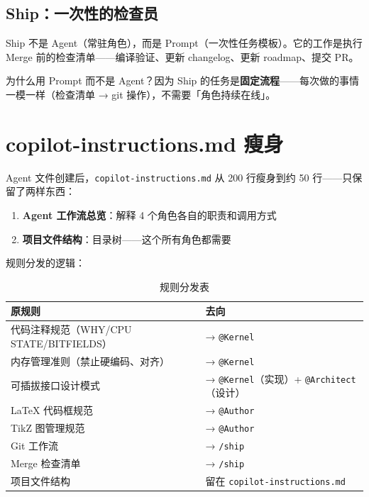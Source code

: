 \subsection{Ship：一次性的检查员}


Ship 不是 Agent（常驻角色），而是 Prompt（一次性任务模板）。它的工作是执行 Merge 前的检查清单——编译验证、更新 changelog、更新 roadmap、提交 PR。

为什么用 Prompt 而不是 Agent？因为 Ship 的任务是\textbf{固定流程}——每次做的事情一模一样（检查清单 → git 操作），不需要「角色持续在线」。

\section{copilot-instructions.md 瘦身}

Agent 文件创建后，\texttt{copilot-instructions.md} 从 200 行瘦身到约 50 行——只保留了两样东西：

\begin{enumerate}
  \item \textbf{Agent 工作流总览}：解释 4 个角色各自的职责和调用方式
  \item \textbf{项目文件结构}：目录树——这个所有角色都需要
\end{enumerate}

规则分发的逻辑：

\begin{table}[H]
\centering
\small
\begin{tabularx}{\textwidth}{lX}
\toprule
\textbf{原规则} & \textbf{去向} \\
\midrule
代码注释规范（WHY/CPU STATE/BITFIELDS） & → \texttt{@Kernel} \\
内存管理准则（禁止硬编码、对齐） & → \texttt{@Kernel} \\
可插拔接口设计模式 & → \texttt{@Kernel}（实现）+ \texttt{@Architect}（设计） \\
LaTeX 代码框规范 & → \texttt{@Author} \\
TikZ 图管理规范 & → \texttt{@Author} \\
Git 工作流 & → \texttt{/ship} \\
Merge 检查清单 & → \texttt{/ship} \\
项目文件结构 & 留在 \texttt{copilot-instructions.md} \\
\bottomrule
\end{tabularx}
\caption{规则分发表}
\end{table}

